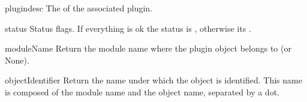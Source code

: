 \begin{datadesc}{plugindesc}
The  of the associated plugin.
\end{datadesc}

\begin{datadesc}{status}
Status flags. If everything is ok the status is , otherwise
its .
\end{datadesc}

\begin{methoddesc}{moduleName}{}
Return the module name where the plugin object belongs to (or None).
\end{methoddesc}

\begin{methoddesc}{objectIdentifier}{}
Return the name under which the object is identified. This name is composed
of the module name and the object name, separated by a dot.
\end{methoddesc}
